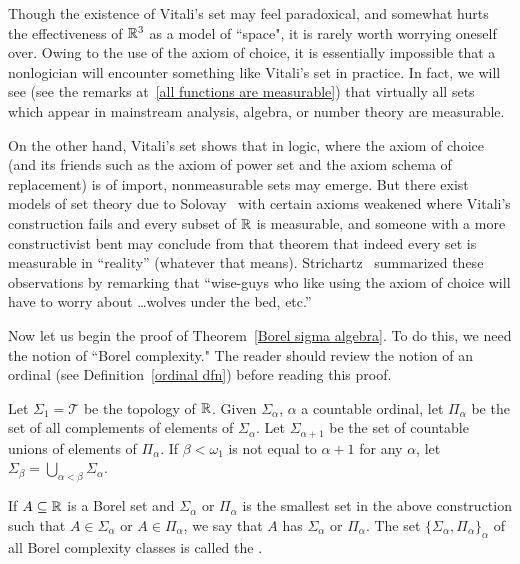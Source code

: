 \begin{subsec}
Though the existence of Vitali's set may feel paradoxical, and somewhat hurts the effectiveness of $\mathbb{R}^3$ as a model of ``space", it is rarely worth worrying oneself over.
Owing to the use of the axiom of choice, it is essentially impossible that a nonlogician will encounter something like Vitali's set in practice.
In fact, we will see (see the remarks at~\ref{all functions are measurable}) that virtually all sets which appear in mainstream analysis, algebra, or number theory are measurable.

On the other hand, Vitali's set shows that in logic, where the axiom of choice (and its friends such as the axiom of power set and the axiom schema of replacement) is of import, nonmeasurable sets may emerge.
But there exist models of set theory due to Solovay~\cite{Solovay1970} with certain axioms weakened where Vitali's construction fails and every subset of $\mathbb{R}$ is measurable, and someone with a more constructivist bent may conclude from that theorem that indeed every set is measurable in ``reality'' (whatever that means).
Strichartz~\cite[Chapter 1]{strichartz2003guide} summarized these observations by remarking that ``wise-guys who like using the axiom of choice will have to worry about \dots wolves under the bed, etc.''
\end{subsec}

\begin{subsec}
Now let us begin the proof of Theorem~\ref{Borel sigma algebra}.
To do this, we need the notion of ``Borel complexity."
The reader should review the notion of an ordinal (see Definition~\ref{ordinal dfn}) before reading this proof.
\end{subsec}

\begin{definition}
Let $\Sigma_{1} = \mathcal T$ be the topology of $\mathbb{R}$.
Given $\Sigma_{\alpha}$, $\alpha$ a countable ordinal, let $\Pi_{\alpha}$ be the set of all complements of elements of $\Sigma_{\alpha}$.
Let $\Sigma_{\alpha+1}$ be the set of countable unions of elements of $\Pi_{\alpha}$.
If $\beta < \omega_{1}$ is not equal to $\alpha+1$ for any $\alpha$, let $\Sigma_{\beta} = \bigcup_{\alpha < \beta} \Sigma_{\alpha}$.

If $A \subseteq \mathbb{R}$ is a Borel set and $\Sigma_{\alpha}$ or $\Pi_{\alpha}$ is the smallest set in the above construction such that $A \in \Sigma_{\alpha}$ or $A \in \Pi_{\alpha}$, we say that $A$ has  $\Sigma_{\alpha}$ or $\Pi_{\alpha}$.
The set $\{\Sigma_{\alpha}, \Pi_{\alpha}\}_{\alpha}$ of all Borel complexity classes is called the .
\end{definition}

